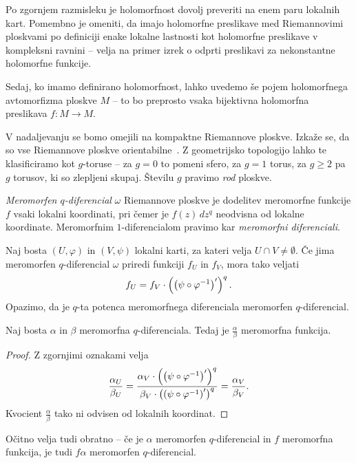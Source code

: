 Po zgornjem razmisleku je holomorfnost dovolj preveriti na enem
paru lokalnih kart. Pomembno je omeniti, da imajo holomorfne
preslikave med Riemannovimi ploskvami po definiciji enake lokalne
lastnosti kot holomorfne preslikave v kompleksni ravnini -- velja
na primer izrek o odprti preslikavi za nekonstantne holomorfne
funkcije.

Sedaj, ko imamo definirano holomorfnost, lahko uvedemo še pojem
holomorfnega avtomorfizma ploskve $M$ -- to bo preprosto vsaka
bijektivna holomorfna preslikava $f \colon M \to M$.

V nadaljevanju se bomo omejili na kompaktne Riemannove ploskve.
Izkaže se, da so vse Riemannove ploskve
orientabilne~\cite[razdelek 1.2.6]{Forstneric}. Z geometrijsko
topologijo lahko te klasificiramo kot $g$-toruse -- za $g=0$ to
pomeni sfero, za $g=1$ torus, za $g \geq 2$ pa $g$ torusov, ki so
zlepljeni skupaj. Številu $g$ pravimo \emph{rod} ploskve.



\begin{definicija}
\emph{Meromorfen $q$-diferencial} $\omega$ Riemannove ploskve je
dodelitev meromorfne funkcije $f$ vsaki lokalni koordinati, pri
čemer je $f(z)\,dz^q$ neodvisna od lokalne koordinate. Meromorfnim
$1$-diferencialom pravimo kar \emph{meromorfni diferenciali}.
\end{definicija}

Naj bosta $(U, \varphi)$ in $(V, \psi)$ lokalni karti, za kateri
velja $U \cap V \ne \emptyset$. Če jima meromorfen $q$-diferencial
$\omega$ priredi funkciji $f_U$ in $f_V$, mora tako veljati
\[
f_U = f_V \cdot \left(\left(\psi \circ \varphi^{-1}\right)'\right)^q.
\]
Opazimo, da je $q$-ta potenca meromorfnega diferenciala meromorfen
$q$-diferencial.

\begin{trditev}
Naj bosta $\alpha$ in $\beta$ meromorfna $q$-diferenciala. Tedaj je
$\frac{\alpha}{\beta}$ meromorfna funkcija.
\end{trditev}

\begin{proof}
Z zgornjimi oznakami velja
\[
\frac{\alpha_U}{\beta_U} =
\frac{\alpha_V \cdot \left(\left(\psi \circ \varphi^{-1}\right)'\right)^q}
{\beta_V \cdot \left(\left(\psi \circ \varphi^{-1}\right)'\right)^q} =
\frac{\alpha_V}{\beta_V}.
\]
Kvocient $\frac{\alpha}{\beta}$ tako ni odvisen od lokalnih
koordinat.
\end{proof}

Očitno velja tudi obratno -- če je $\alpha$ meromorfen
$q$-diferencial in $f$ meromorfna funkcija, je tudi $f \alpha$
meromorfen $q$-diferencial.

